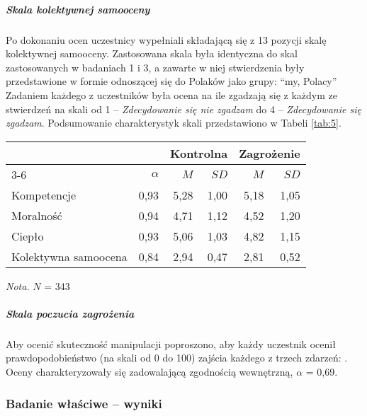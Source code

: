 \documentclass[man]{apa6}
\begin{document}
\subparagraph{Skala kolektywnej samooceny}
Po dokonaniu ocen uczestnicy wypełniali składającą się z 13 pozycji skalę kolektywnej samooceny. Zastosowana skala była identyczna do skal zastosowanych w badaniach 1 i 3, a zawarte w niej stwierdzenia były przedstawione w formie odnoszącej się do Polaków jako grupy: ``my, Polacy'' Zadaniem każdego z uczestników była ocena na ile zgadzają się z każdym ze stwierdzeń na skali od 1 -- \emph{Zdecydowanie się nie zgadzam} do 4 -- \emph{Zdecydowanie się zgadzam}. Podsumowanie charakterystyk skali przedstawiono w Tabeli \ref{tab:5}.

\begin{table*}[htbp]
\vspace*{2em}
\centering
\begin{threeparttable}
\caption{Podstawowe statystyki opisowe dla skal użytych w Badaniu 4}
\label{tab:5}

\begin{tabular}{lrrrrr}

\midrule
& & \multicolumn{2}{c}{Kontrolna} & \multicolumn{2}{c}{Zagrożenie}  \\
\cline{3-6}
& $\alpha$ & $M$ & $SD$ & $M$ & $SD$  \\
\midrule
Kompetencje            & 0,93 & 5,28 & 1,00 & 5,18 & 1,05  \\
Moralność              & 0,94 & 4,71 & 1,12 & 4,52 & 1,20  \\
Ciepło                 & 0,93 & 5,06 & 1,03 & 4,82 & 1,15  \\
Kolektywna samoocena   & 0,84 & 2,94 & 0,47 & 2,81 & 0,52  \\

\bottomrule

\end{tabular}

\begin{tablenotes}
{\small
\textit{Nota.} $N$ = 343
}
\end{tablenotes}
\end{threeparttable}
\end{table*}

\subparagraph{Skala poczucia zagrożenia} Aby ocenić skuteczność manipulacji poproszono, aby każdy uczestnik ocenił prawdopodobieństwo (na skali od 0 do 100) zajścia każdego z trzech zdarzeń: \emph{}. Oceny charakteryzowały się zadowalającą zgodnością wewnętrzną, $\alpha$ = 0,69.

\subsubsection{Badanie właściwe -- wyniki}
\end{document}

